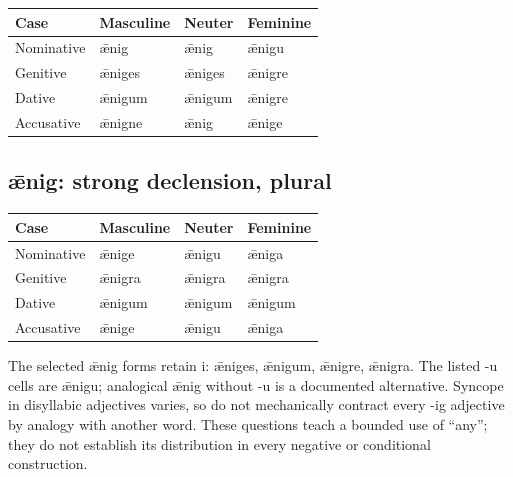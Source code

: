 \par\begingroup
\fontsize{10.5}{13.2}\selectfont
\setlength{\LTleft}{0pt}\setlength{\LTright}{\fill}
\noindent
\begin{tabular}{@{}>{\raggedright\arraybackslash}p{28.89mm}>{\raggedright\arraybackslash}p{28.89mm}>{\raggedright\arraybackslash}p{28.89mm}>{\raggedright\arraybackslash}p{28.89mm}@{}}
\toprule
\textbf{Case} & \textbf{Masculine} & \textbf{Neuter} & \textbf{Feminine} \\
\midrule
Nominative & ǣnig & ǣnig & ǣnigu \\
Genitive & ǣniges & ǣniges & ǣnigre \\
Dative & ǣnigum & ǣnigum & ǣnigre \\
Accusative & ǣnigne & ǣnig & ǣnige \\
\bottomrule
\end{tabular}
\par\endgroup

\subsection*{ǣnig: strong declension, plural}

\par\begingroup
\fontsize{10.5}{13.2}\selectfont
\setlength{\LTleft}{0pt}\setlength{\LTright}{\fill}
\noindent
\begin{tabular}{@{}>{\raggedright\arraybackslash}p{28.89mm}>{\raggedright\arraybackslash}p{28.89mm}>{\raggedright\arraybackslash}p{28.89mm}>{\raggedright\arraybackslash}p{28.89mm}@{}}
\toprule
\textbf{Case} & \textbf{Masculine} & \textbf{Neuter} & \textbf{Feminine} \\
\midrule
Nominative & ǣnige & ǣnigu & ǣniga \\
Genitive & ǣnigra & ǣnigra & ǣnigra \\
Dative & ǣnigum & ǣnigum & ǣnigum \\
Accusative & ǣnige & ǣnigu & ǣniga \\
\bottomrule
\end{tabular}
\par\endgroup

The selected ǣnig forms retain i: ǣniges, ǣnigum, ǣnigre, ǣnigra. The listed -u cells are ǣnigu; analogical ǣnig without -u is a documented alternative. Syncope in disyllabic adjectives varies, so do not mechanically contract every -ig adjective by analogy with another word. These questions teach a bounded use of “any”; they do not establish its distribution in every negative or conditional construction.

